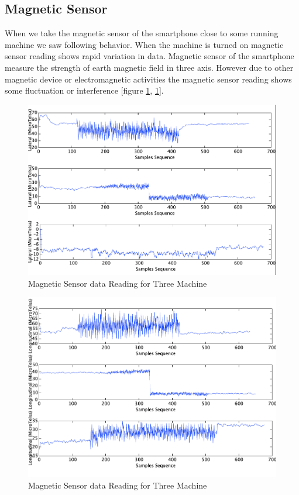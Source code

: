 \documentclass[11pt]{amsart}
\begin{document}
\subsection{Magnetic Sensor}

When we take the magnetic sensor of the smartphone close to some running machine we saw following behavior. When the machine is turned on magnetic sensor reading shows rapid variation in data. Magnetic sensor of the smartphone measure the strength of earth magnetic field in three axis. However due to other magnetic device or electromagnetic activities the magnetic sensor reading shows some fluctuation or interference [figure \ref{fig:magnetic1}, \ref{fig:magnetic1}].

\begin{figure}[htb]
\begin{center}
\includegraphics[width=1.0\linewidth, angle = 0]{magnetic1.png}
\caption{Magnetic Sensor data Reading for Three Machine} \label{fig:magnetic1}
\end{center}
\end{figure}


\begin{figure}[htb]
\begin{center}
\includegraphics[width=1.0\linewidth, angle = 0]{magnetic2.png}
\caption{Magnetic Sensor data Reading for Three Machine} \label{fig:magnetic2}
\end{center}
\end{figure}
\end{document}
